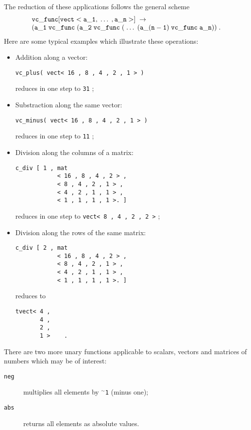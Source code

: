 The reduction of these applications follows the general
scheme
$$
\begin{array}{l}
{\tt vc\_func[vect<a\_1,\;\ldots\;,a\_n>]\;\rightarrow\;}
\phantom{xxxx}
\\ \multicolumn{1}{r}{{\tt 
(a\_1\;vc\_func\;(a\_2\;vc\_func\;(\;\ldots\;(a\_(n-1)\;vc\_func\;
a\_n))}\;.}
\end{array}
$$
Here are some typical examples which illustrate these operations:
\begin{itemize}
\item Addition along a vector:
\begin{verbatim}
vc_plus( vect< 16 , 8 , 4 , 2 , 1 > )
\end{verbatim}
reduces in one step to {\tt 31} ;
\item Substraction along the same vector:
\begin{verbatim}
vc_minus( vect< 16 , 8 , 4 , 2 , 1 > )
\end{verbatim}
reduces in one step to {\tt 11}  ;
\item Division along the columns of a matrix:
\begin{verbatim}
c_div [ 1 , mat 
            < 16 , 8 , 4 , 2 > ,
            < 8 , 4 , 2 , 1 > ,
            < 4 , 2 , 1 , 1 > ,
            < 1 , 1 , 1 , 1 >. ]
\end{verbatim}
reduces in one step to {\tt vect< 8 , 4 , 2 , 2 >} ;
\item Division along the rows of the same matrix:
\begin{verbatim}
c_div [ 2 , mat 
            < 16 , 8 , 4 , 2 > ,
            < 8 , 4 , 2 , 1 > ,
            < 4 , 2 , 1 , 1 > ,
            < 1 , 1 , 1 , 1 >. ]
\end{verbatim}
reduces to
\begin{verbatim}
tvect< 4 ,
       4 ,
       2 ,
       1 >    .
\end{verbatim}
\end{itemize}

There are two more unary functions applicable to scalars,
vectors and matrices of numbers which may be of interest:
\begin{description}
\item[{\tt neg}] multiplies all elements by {\tt $^{\sim}$1} (minus one);
\item[{\tt abs}] returns all elements as absolute values.
\end{description}

